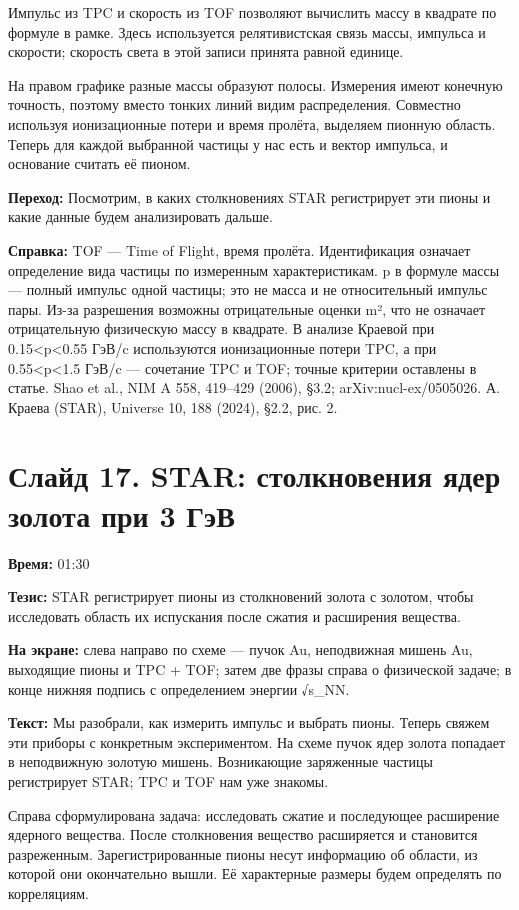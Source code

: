 \documentclass[11pt,a4paper]{article}
\begin{document}
Импульс из TPC и скорость из TOF позволяют вычислить массу в квадрате по формуле в рамке. Здесь используется релятивистская связь массы, импульса и скорости; скорость света в этой записи принята равной единице.

На правом графике разные массы образуют полосы. Измерения имеют конечную точность, поэтому вместо тонких линий видим распределения. Совместно используя ионизационные потери и время пролёта, выделяем пионную область. Теперь для каждой выбранной частицы у нас есть и вектор импульса, и основание считать её пионом.

\textbf{Переход:} Посмотрим, в каких столкновениях STAR регистрирует эти пионы и какие данные будем анализировать дальше.

\textbf{Справка:} TOF — Time of Flight, время пролёта. Идентификация означает определение вида частицы по измеренным характеристикам. p в формуле массы — полный импульс одной частицы; это не масса и не относительный импульс пары. Из-за разрешения возможны отрицательные оценки m², что не означает отрицательную физическую массу в квадрате. В анализе Краевой при 0.15<p<0.55 ГэВ/c используются ионизационные потери TPC, а при 0.55<p<1.5 ГэВ/c — сочетание TPC и TOF; точные критерии оставлены в статье. Shao et al., NIM A 558, 419–429 (2006), §3.2; arXiv:nucl-ex/0505026. А. Краева (STAR), Universe 10, 188 (2024), §2.2, рис. 2.

\clearpage
\section*{Слайд 17. STAR: столкновения ядер золота при 3 ГэВ}
\textbf{Время:} 01:30

\textbf{Тезис:} STAR регистрирует пионы из столкновений золота с золотом, чтобы исследовать область их испускания после сжатия и расширения вещества.

\textbf{На экране:} слева направо по схеме — пучок Au, неподвижная мишень Au, выходящие пионы и TPC + TOF; затем две фразы справа о физической задаче; в конце нижняя подпись с определением энергии √s\_NN.

\textbf{Текст:} Мы разобрали, как измерить импульс и выбрать пионы. Теперь свяжем эти приборы с конкретным экспериментом. На схеме пучок ядер золота попадает в неподвижную золотую мишень. Возникающие заряженные частицы регистрирует STAR; TPC и TOF нам уже знакомы.

Справа сформулирована задача: исследовать сжатие и последующее расширение ядерного вещества. После столкновения вещество расширяется и становится разреженным. Зарегистрированные пионы несут информацию об области, из которой они окончательно вышли. Её характерные размеры будем определять по корреляциям.
\end{document}
